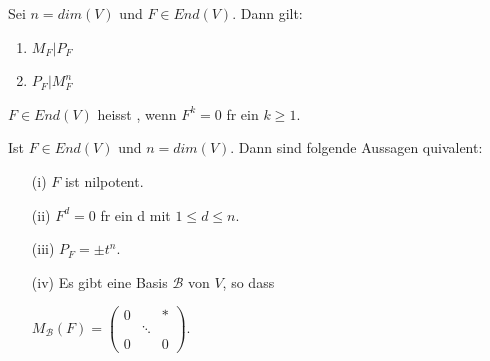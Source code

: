 \documentclass[11pt, a4paper]{article}
\begin{document}
\begin{theorem}
Sei $n = dim (V)$ und $F \in End(V)$. Dann gilt:
\begin{enumerate}
\item $M_F | P_F$
\item $P_F | M_F^n$
\end{enumerate}
\end{theorem}
\begin{definition}
$F \in End(V)$ heisst , wenn $F^k = 0$ f\uee r ein $k \geq 1$.
\end{definition}
\begin{theorem}
Ist $F \in End(V)$ und $n = dim(V)$. Dann sind folgende Aussagen \aee quivalent:
\begin{itemize}
\item[(i)] $F$ ist nilpotent.
\item[(ii)] $F^d = 0$ f\uee r ein d mit $1 \leq d \leq n$.
\item[(iii)] $P_F = \pm t^n$.
\item[(iv)] Es gibt eine Basis $\mathcal{B}$ von $V$, so dass 
\\ \centerline{
$M_{\mathcal{B}}(F)=\left(\begin{array}{ccc}
{0} & {} & {*} \\ {} & {\ddots} & {} 
\\ {0} & {} & {0}\end{array}\right)$.
}
\end{itemize}
\end{theorem}
\end{document}
